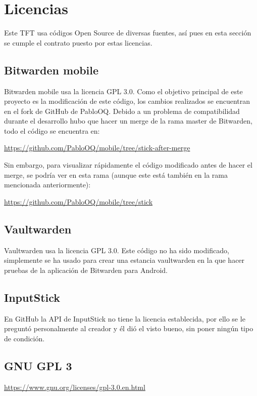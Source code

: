 \section{Licencias}
Este TFT usa códigos Open Source de diversas fuentes, así pues en esta sección se cumple el contrato puesto por estas licencias.
\subsection{Bitwarden mobile}
Bitwarden mobile  usa la licencia GPL 3.0. Como el objetivo principal de este proyecto es la modificación de este código, los cambios realizados se encuentran en el fork de GitHub de PabloOQ.
Debido a un problema de compatibilidad durante el desarrollo hubo que hacer un merge de la rama master de Bitwarden, todo el código se encuentra en:

\noindent\url{https://github.com/PabloOQ/mobile/tree/stick-after-merge}

\noindent Sin embargo, para visualizar rápidamente el código modificado antes de hacer el merge, se podría ver en esta rama (aunque este está también en la rama mencionada anteriormente):

\noindent\url{https://github.com/PabloOQ/mobile/tree/stick}

\subsection{Vaultwarden}
Vaultwarden usa la licencia GPL 3.0. Este código no ha sido modificado, simplemente se ha usado para crear una estancia vaultwarden en la que hacer pruebas de la aplicación de Bitwarden para Android.

\subsection{InputStick}
En GitHub la API de InputStick no tiene la licencia establecida, por ello se le preguntó personalmente al creador y él dió el visto bueno, sin poner ningún tipo de condición.

\subsection{GNU GPL 3}
\url{https://www.gnu.org/licenses/gpl-3.0.en.html}

